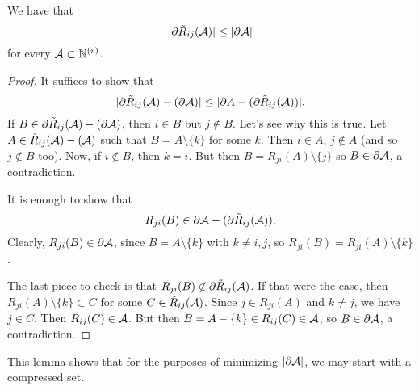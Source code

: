 \begin{lemma} \label{lem:compression_decreases_size_of_shadow}We have that
\[
|\partial \tilde{R}_{ij}(\mathcal{A})| \leq |\partial \mathcal{A}|
\]
for every $\mathcal{A}\subset \mathbb{N}^{(r)}$.
\end{lemma}
\begin{proof}	

It suffices to show that
\[
|\partial \tilde{R}_{ij}(\mathcal{A})-(\partial \mathcal{A})| \leq | \partial A-(\partial \tilde{R}_{ij}(\mathcal{A}))|.
\]
If $B\in \partial \tilde{R}_{ij}(\mathcal{A})- (\partial \mathcal{A})$, then $i\in B$ but $j\not\in B$. Let's see why this is true. Let $A\in  \tilde{R}_{ij}(\mathcal{A})- (\mathcal{A})$ such that $B = A\setminus\{k\}$ for some $k$. Then $i\in A$, $j\not \in A$ (and so $j\not \in B$ too). Now, if $i\not \in B$, then $k=i$. But then $B = R_{ji}(A)\setminus\{j\}$ so $B\in \partial \mathcal{A}$, a contradiction.



It is enough to show that
\[
R_{ji}(B)\in \partial \mathcal{A}-(\partial \tilde{R}_{ij}(\mathcal{A})).
\]
Clearly, $R_{ji}(B)\in \partial \mathcal{A}$, since $B= A\setminus\{k\}$ with $k\neq i,j$, so $R_{ji}(B) = R_{ji}(A)\setminus\{k\}$.

The last piece to check is that $R_{ji}(B)\not\in \partial \tilde{R}_{ij}(\mathcal{A})$. If that were the case, then $R_{ji}(A)\setminus\{k\} \subset C$ for some $C \in \tilde{R}_{ij}(\mathcal{A})$. Since $j\in R_{ji}(A)$ and $k\neq j$, we have $j\in C$. Then $R_{ij}(C) \in \mathcal{A}$. But then $B=A- \{k\} \in R_{ij}(C) \in \mathcal{A}$, so $B \in \partial \mathcal{A}$, a contradiction.
\end{proof}
This lemma shows that for the purposes of minimizing $|\partial \mathcal{A}|$, we may start with a compressed set.

